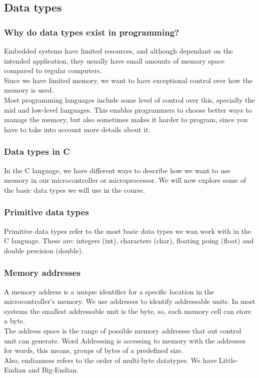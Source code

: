 \documentclass[aspectratio=169]{beamer}
\begin{document}
\subsection{Data types}
\begin{frame}
  \frametitle{Why do data types exist in programming?}
  Embedded systems have limited resources, and although dependant on the intended application, they usually have small amounts of memory space compared to regular computers.\\ \pause
  Since we have limited memory, we want to have exceptional control over how the memory is used. \\ \pause
  Most programming languages include some level of control over this, specially the mid and low-level languages. This enables programmers to choose better ways to manage the memory, but also sometimes makes it harder to program, since you have to take into account more details about it.
\end{frame}

\begin{frame}
  \frametitle{Data types in C}
  In the C language, we have different ways to describe how we want to use memory in our microcontroller or microprocessor. We will now explore some of the basic data types we will use in the course.
\end{frame}

\begin{frame}
  \frametitle{Primitive data types}
  Primitive data types refer to the most basic data types we wan work with in the C language. These are: integers (int), characters (char), floating poing (float) and double precision (double).
\end{frame}

\begin{frame}
  \frametitle{Memory addresses}
  A memory address is a unique identifier for a specific location in the microcontroller's memory. \pause
  We use addresses to identify addressable units. In most systems the smallest addressable unit is the byte, so, each memory cell can store a byte. \\ \pause
  The address space is the range of possible memory addresses that out control unit can generate. \pause
  Word Addressing is accessing to memory with the addresses for words, this means, groups of bytes of a predefined size.\\ \pause
  Also, endianness refers to the order of multi-byte datatypes. We have Little-Endian and Big-Endian.
\end{frame}
\end{document}
